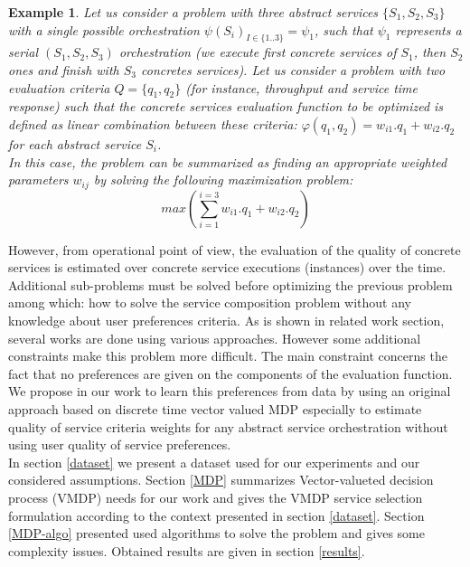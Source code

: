 \documentclass[10pt,journal,compsoc]{IEEEtran}
\newtheorem{example}{Example}
\begin{document}
\begin{example} Let us consider a problem with three abstract services $\{S_1,S_2,S_3\}$ with a single possible orchestration $\psi(S_i)_{I\in\{1..3\}}=\psi_1$, such that $\psi_1$ represents a serial $(S_1,S_2,S_3)$ orchestration (we execute first concrete services of $S_1$, then $S_2$ ones and finish with $S_3$ concretes services). Let us consider a problem with two evaluation criteria $Q=\{q_1,q_2\}$ (for instance, throughput and service time response) such that the concrete services evaluation function to be optimized is defined as linear combination between these criteria: $\varphi(q_1,q_2)= w_{i1}.q_1+w_{i2}.q_2$ for each abstract service $S_i$. \\
In this case, the problem can be summarized as finding an appropriate weighted parameters $w_{ij}$ by solving the following maximization problem:
$$ max(\sum_{i=1}^{i=3} w_{i1}.q_1+w_{i2}.q_2)$$
\end{example}
However, from operational point of view, the evaluation of the quality of concrete services is estimated over concrete service executions (instances) over the time. Additional sub-problems must be solved before optimizing the previous problem among which: how to solve the service composition problem without any knowledge about user preferences criteria. 
As is shown in related work section, several works are done using various approaches. However some additional constraints make this problem more difficult. The main constraint concerns the fact that no preferences are given on the components of the evaluation function. We propose in our work to learn this preferences from data by using an original approach based on discrete time vector valued MDP especially to estimate quality of service criteria weights for any abstract service orchestration without using user quality of service preferences.\\
 In section \ref{dataset} we present a dataset used for our experiments and our considered assumptions. Section \ref{MDP} summarizes Vector-valueted decision process (VMDP) needs for our work and gives the VMDP service selection formulation according to the context presented in section \ref{dataset}.  Section \ref{MDP-algo} presented used algorithms to solve the problem and gives some complexity issues. Obtained results are given in section \ref{results}. 
 
\end{document}
